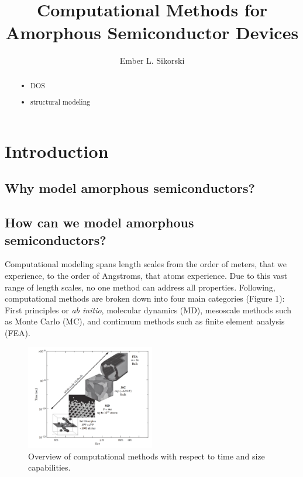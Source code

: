 \documentclass[3p,review,12pt]{elsarticle}
\begin{document}
\begin{frontmatter}
	\title{Computational Methods for Amorphous Semiconductor Devices}
	
	\author[boise]{Ember L. Sikorski}
	
	
	\address[boise]{Boise State University}
	
	\begin{abstract}
\begin{itemize}
	\item DOS
	\item structural modeling
\end{itemize}
	\end{abstract}
	
	
\end{frontmatter}

\section{Introduction}
\subsection{Why model amorphous semiconductors?}


\subsection{How can we model amorphous semiconductors?}
Computational modeling spans length scales from the order of meters, that we experience, to the order of Angstroms, that atoms experience. Due to this vast range of length scales, no one method can address all properties. Following, computational methods are broken down into four main categories (Figure 1): First principles or \textit{ab initio}, molecular dynamics (MD), mesoscale methods such as Monte Carlo (MC), and continuum methods such as finite element analysis (FEA)\cite{Lee2012}.
\begin{figure}[H]
	\includegraphics[width=0.5\textwidth]{overview}
	\centering
	\caption{Overview of computational methods with respect to time and size capabilities. \cite{Lee2012}}
\end{figure}
\end{document}
